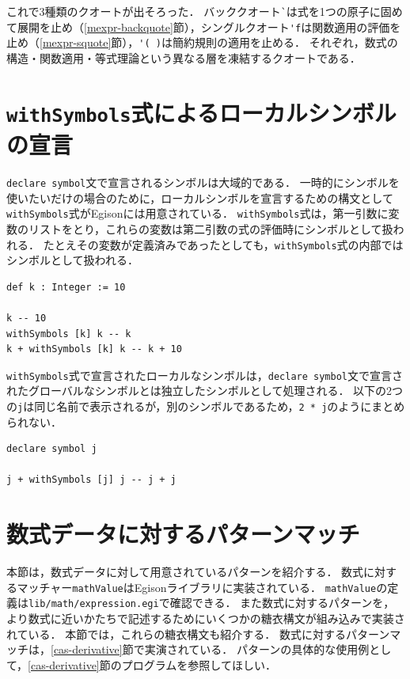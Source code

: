 これで3種類のクオートが出そろった．
バッククオート\lstinline{`}は式を1つの原子に固めて展開を止め（\ref{mexpr-backquote}節），シングルクオート\lstinline{'f}は関数適用の評価を止め（\ref{mexpr-squote}節），\lstinline{'( )}は簡約規則の適用を止める．
それぞれ，数式の構造・関数適用・等式理論という異なる層を凍結するクオートである．

\section{\texttt{withSymbols}式によるローカルシンボルの宣言}\label{mexpr-withsym}

\lstinline{declare symbol}文で宣言されるシンボルは大域的である．
一時的にシンボルを使いたいだけの場合のために，ローカルシンボルを宣言するための構文として\lstinline{withSymbols}式がEgisonには用意されている．
\lstinline{withSymbols}式は，第一引数に変数のリストをとり，これらの変数は第二引数の式の評価時にシンボルとして扱われる．
たとえその変数が定義済みであったとしても，\lstinline{withSymbols}式の内部ではシンボルとして扱われる．
\begin{lstlisting}[language=egison,numbers=none]
def k : Integer := 10

k -- 10
withSymbols [k] k -- k
k + withSymbols [k] k -- k + 10
\end{lstlisting}

\lstinline{withSymbols}式で宣言されたローカルなシンボルは，\lstinline{declare symbol}文で宣言されたグローバルなシンボルとは独立したシンボルとして処理される．
以下の2つの\lstinline{j}は同じ名前で表示されるが，別のシンボルであるため，\lstinline{2 * j}のようにまとめられない．
\begin{lstlisting}[language=egison,numbers=none]
declare symbol j

j + withSymbols [j] j -- j + j
\end{lstlisting}

\section{数式データに対するパターンマッチ}\label{mexpr-pattern}

本節は，数式データに対して用意されているパターンを紹介する．
数式に対するマッチャー\lstinline{mathValue}はEgisonライブラリに実装されている．
\lstinline{mathValue}の定義は\texttt{lib/math/expression.egi}で確認できる．
また数式に対するパターンを，より数式に近いかたちで記述するためにいくつかの糖衣構文が組み込みで実装されている．
本節では，これらの糖衣構文も紹介する．
数式に対するパターンマッチは，\ref{cas-derivative}節で実演されている．
パターンの具体的な使用例として，\ref{cas-derivative}節のプログラムを参照してほしい．

